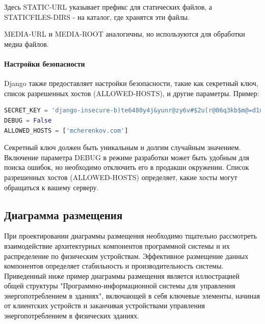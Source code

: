 Здесь STATIC-URL указывает префикс для статических файлов, а STATICFILES-DIRS - на каталог, где хранятся эти файлы.

MEDIA-URL и MEDIA-ROOT аналогичны, но используются для обработки медиа файлов.

\paragraph{Настройки безопасности}

Django также предоставляет настройки безопасности, такие как секретный ключ, список разрешенных хостов (ALLOWED-HOSTS), и другие параметры. Пример:

 
\begin{lstlisting}[language=Python]
SECRET_KEY = 'django-insecure-b)te6480y4j&yunr@zy6v#$2u(r@06q3kb$m@=d1n!_8t&(xj!'
DEBUG = False
ALLOWED_HOSTS = ['mcherenkov.com']
\end{lstlisting} 
 
Секретный ключ должен быть уникальным и долгим случайным значением. Включение параметра DEBUG в режиме разработки может быть удобным для поиска ошибок, но необходимо отключить его в продакшн окружении. Список разрешенных хостов (ALLOWED-HOSTS) определяет, какие хосты могут обращаться к вашему серверу. 

 
\subsection{Диаграмма размещения}

При проектировании диаграммы размещения необходимо тщательно рассмотреть взаимодействие архитектурных компонентов программной системы и их распределение по физическим устройствам. Эффективное размещение данных компонентов определяет стабильность и производительность системы. Приведенный ниже пример диаграммы размещения является иллюстрацией общей структуры "Программно-информационной системы для управления энергопотреблением в зданиях", включающей в себя ключевые элементы, начиная от клиентских устройств и заканчивая устройствами управления энергопотреблением в физических зданиях.

